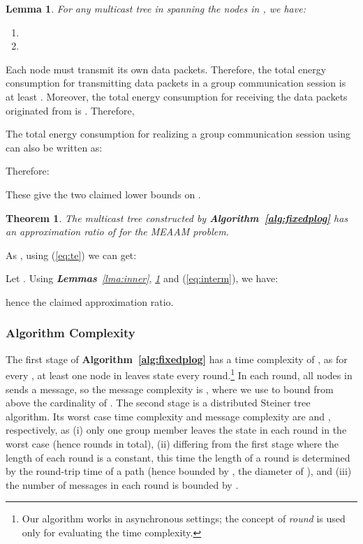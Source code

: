 \documentclass[10pt, conference, compsocconf]{IEEEtran}
\newtheorem{lemma}{\textbf{Lemma}}
\newtheorem{theorem}{\textbf{Theorem}}
\begin{document}
    \begin{lemma}
For any multicast tree  in  spanning the nodes in , we have:
\begin{enumerate}
\item 
\item 
\end{enumerate}
      \label{lma:lowebound}
\end{lemma}
\begin{IEEEproof}
Each node  must transmit its own  data packets. Therefore, the total energy consumption for transmitting data packets in a group communication session is at least . Moreover, the total energy consumption for receiving the data packets originated from  is . Therefore,


      The total energy consumption for realizing a group communication session using  can also be written as:


      Therefore:

These give the two claimed lower bounds on .
    \end{IEEEproof}


    \begin{theorem}
The multicast tree  constructed by \textbf{Algorithm~\ref{alg:fixedplog}} has an approximation ratio of  for the MEAAM problem.
      \label{thm:fixedratio}
\end{theorem}
\begin{IEEEproof}
As , using (\ref{eq:te}) we can get:


      Let . Using \textit{\textbf{Lemmas}~\ref{lma:inner}}, \textit{\ref{lma:lowebound}} and (\ref{eq:interm}), we have:

      hence the claimed approximation ratio.
    \end{IEEEproof}

    \subsubsection{Algorithm Complexity} The first stage of \textbf{Algorithm~\ref{alg:fixedplog}} has a time complexity of , as for every , at least one node in  leaves  state every round.\footnote{Our algorithm works in asynchronous settings; the concept of \textit{round} is used only for evaluating the time complexity.} In each round, all nodes in  sends a message, so the message complexity is , where we use  to bound from above the cardinality of . The second stage is a distributed Steiner tree algorithm. Its worst case time complexity and message complexity are  and , respectively, as (i) only one group member leaves the  state in each round in the worst case (hence  rounds in total), (ii) differing from the first stage where the length of each round is a constant, this time the length of a round is determined by the round-trip time of a path (hence bounded by , the diameter of ), and (iii) the number of messages in each round is bounded by .
\end{document}
